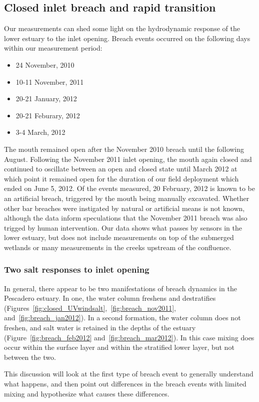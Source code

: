 \subsection{Closed inlet breach and rapid transition} \label{breach_dynamics}
Our measurements can shed some light on the hydrodynamic response of the lower estuary to the inlet opening. Breach events occurred on the following days within our measurement period:
\begin{itemize}
	\item 24 November, 2010
	\item 10-11 November, 2011
	\item 20-21 January, 2012
	\item 20-21 Feburary, 2012
	\item 3-4 March, 2012
\end{itemize}
The mouth remained open after the November 2010 breach until the following August. Following the November 2011 inlet opening, the mouth again closed and continued to oscillate between an open and closed state until March 2012 at which point it remained open for the duration of our field deployment which ended on June 5, 2012. Of the events measured, 20 February, 2012 is known to be an artificial breach, triggered by the mouth being manually excavated. Whether other bar breaches were instigated by natural or artificial means is not known, although the data inform speculations that the November 2011 breach was also trigged by human intervention. Our data shows what passes by sensors in the lower estuary, but does not include measurements on top of the submerged wetlands or many measurements in the creeks upstream of the confluence.

\subsubsection{Two salt responses to inlet opening}
In general, there appear to be two manifestations of breach dynamics in the Pescadero estuary.  In one, the water column freshens and destratifies (Figures~\ref{fig:closed_UVwindsalt},~\ref{fig:breach_nov2011}, and~\ref{fig:breach_jan2012}). In a second formation, the water column does not freshen, and salt water is retained in the depths of the estuary (Figure~\ref{fig:breach_feb2012} and~\ref{fig:breach_mar2012}). In this case mixing does occur within the surface layer and within the stratified lower layer, but not between the two.

This discussion will look at the first type of breach event to generally understand what happens, and then point out differences in the breach events with limited mixing and hypothesize what causes these differences. 

